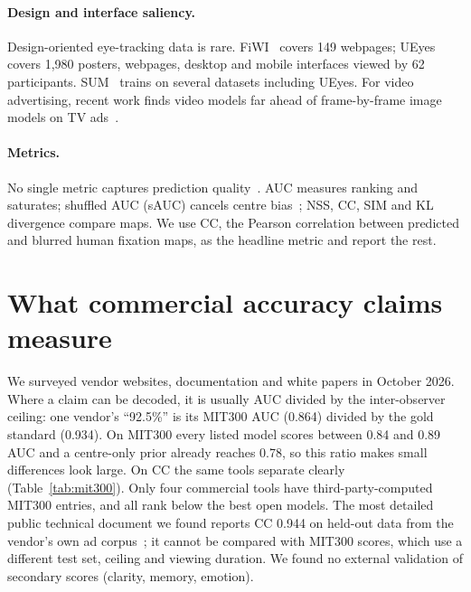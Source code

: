 \documentclass[11pt]{article}
\begin{document}
\paragraph{Design and interface saliency.} Design-oriented eye-tracking data is rare. FiWI~\cite{shen2014webpage}
covers 149 webpages; UEyes~\cite{jiang2023ueyes} covers 1,980 posters, webpages, desktop and mobile interfaces viewed
by 62 participants. SUM~\cite{hosseini2024sum} trains on several datasets including UEyes. For video advertising,
recent work finds video models far ahead of frame-by-frame image models on TV ads~\cite{ye2026viasnet}.

\paragraph{Metrics.} No single metric captures prediction quality~\cite{bylinskii2019metrics}. AUC measures ranking and
saturates; shuffled AUC (sAUC) cancels centre bias~\cite{tatler2007central}; NSS, CC, SIM and KL divergence compare
maps. We use CC, the Pearson correlation between predicted and blurred human fixation maps, as the headline metric and
report the rest.

\section{What commercial accuracy claims measure}\label{sec:commercial}
We surveyed vendor websites, documentation and white papers in October 2026. Where a claim can be decoded, it is usually
AUC divided by the inter-observer ceiling: one vendor's ``92.5\%'' is its MIT300 AUC (0.864) divided by the gold
standard (0.934). On MIT300 every listed model scores between 0.84 and 0.89 AUC and a centre-only prior already reaches
0.78, so this ratio makes small differences look large. On CC the same tools separate clearly
(Table~\ref{tab:mit300}). Only four commercial tools have third-party-computed MIT300 entries, and all rank below the
best open models. The most detailed public technical document we found reports CC 0.944 on held-out data from the
vendor's own ad corpus~\cite{neurons2025tech}; it cannot be compared with MIT300 scores, which use a different test
set, ceiling and viewing duration. We found no external validation of secondary scores (clarity, memory, emotion).
\end{document}
